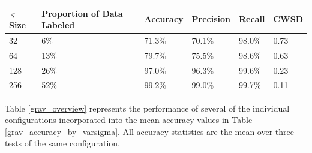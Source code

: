\documentclass[10pt]{article}
\begin{document}
\begin{minipage}{\textwidth}
    \begin{center}
         \label{grav_accuracy_by_varsigma}
        \begin{tabular}{|l|l|l|l|l|l|}
            \hline
            $\varsigma$ Size & Proportion of Data Labeled & Accuracy & Precision & Recall & CWSD \\
            \hline
            32 & 6\% & 71.3\% & 70.1\% & 98.0\% & 0.73 \\
            \hline
            64 & 13\% & 79.7\% & 75.5\% & 98.6\% & 0.63 \\
            \hline
            128 & 26\% & 97.0\% & 96.3\% & 99.6\% & 0.23 \\
            \hline
            256 & 52\% & 99.2\% & 99.0\% & 99.7\% & 0.11 \\
            \hline
        \end{tabular}
    \end{center}
\end{minipage}

Table \ref{grav_overview} represents the performance of several of the individual configurations incorporated into the mean accuracy values in Table \ref{grav_accuracy_by_varsigma}. All accuracy statistics are the mean over three tests of the same configuration.
\end{document}
